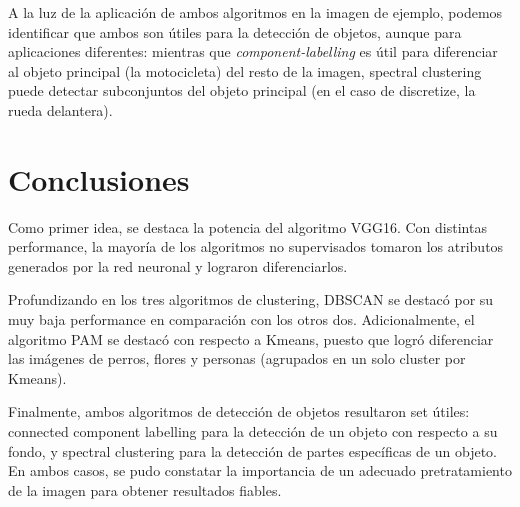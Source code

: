 \documentclass[journal,article,submit,pdftex,moreauthors]{Definitions/mdpi}
\begin{document}
A la luz de la aplicación de ambos algoritmos en la imagen de ejemplo, podemos identificar que ambos son útiles para la detección de objetos, aunque para aplicaciones diferentes: mientras que \textit{component-labelling} es útil para diferenciar al objeto principal (la motocicleta) del resto de la imagen, spectral clustering puede detectar subconjuntos del objeto principal (en el caso de discretize, la rueda delantera).

\section{Conclusiones}
Como primer idea, se destaca la potencia del algoritmo VGG16. Con distintas performance, la mayoría de los algoritmos no supervisados tomaron los atributos generados por la red neuronal y lograron diferenciarlos.

Profundizando en los tres algoritmos de clustering, DBSCAN se destacó por su muy baja performance en comparación con los otros dos. Adicionalmente, el algoritmo PAM se destacó con respecto a Kmeans, puesto que logró diferenciar las imágenes de perros, flores y personas (agrupados en un solo cluster por Kmeans).

Finalmente, ambos algoritmos de detección de objetos resultaron set útiles: connected component labelling para la detección de un objeto con respecto a su fondo, y spectral clustering para la detección de partes específicas de un objeto. En ambos casos, se pudo constatar la importancia de un adecuado pretratamiento de la imagen para obtener resultados fiables.
\end{document}
